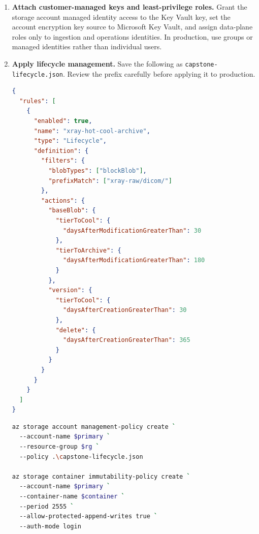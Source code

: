 \begin{enumerate}
\begin{lstlisting}[language=bash,caption={PowerShell plus Azure CLI for the primary ADLS Gen2 account.},label={lst:ch1-capstone-primary-cli}]
az storage fs create `
  --account-name $primary `
  --name $container `
  --auth-mode login

az storage fs create `
  --account-name $secondary `
  --name $container `
  --auth-mode login
\end{lstlisting}

    \item \textbf{Attach customer-managed keys and least-privilege roles.} Grant the storage account managed identity access to the Key Vault key, set the account encryption key source to Microsoft Key Vault, and assign data-plane roles only to ingestion and operations identities. In production, use groups or managed identities rather than individual users.

    \item \textbf{Apply lifecycle management.} Save the following as \texttt{capstone-lifecycle.json}. Review the prefix carefully before applying it to production.
\begin{lstlisting}[language=json,caption={Lifecycle policy for raw X-ray images and older versions.},label={lst:ch1-capstone-lifecycle-json}]
{
  "rules": [
    {
      "enabled": true,
      "name": "xray-hot-cool-archive",
      "type": "Lifecycle",
      "definition": {
        "filters": {
          "blobTypes": ["blockBlob"],
          "prefixMatch": ["xray-raw/dicom/"]
        },
        "actions": {
          "baseBlob": {
            "tierToCool": {
              "daysAfterModificationGreaterThan": 30
            },
            "tierToArchive": {
              "daysAfterModificationGreaterThan": 180
            }
          },
          "version": {
            "tierToCool": {
              "daysAfterCreationGreaterThan": 30
            },
            "delete": {
              "daysAfterCreationGreaterThan": 365
            }
          }
        }
      }
    }
  ]
}
\end{lstlisting}

\begin{lstlisting}[language=bash,caption={Applying lifecycle, immutable retention, legal hold, and object replication.},label={lst:ch1-capstone-policy-cli}]
az storage account management-policy create `
  --account-name $primary `
  --resource-group $rg `
  --policy .\capstone-lifecycle.json

az storage container immutability-policy create `
  --account-name $primary `
  --container-name $container `
  --period 2555 `
  --allow-protected-append-writes true `
  --auth-mode login


\end{lstlisting}
\end{enumerate}
